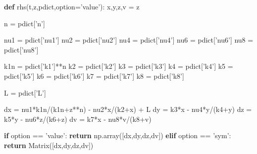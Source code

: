 \documentclass[
  english,
  a4paper,
  oneside]{article}
\newenvironment{Shaded}{}{}
\newcommand{\ControlFlowTok}[1]{\textcolor[rgb]{0.00,0.44,0.13}{\textbf{#1}}}
\newcommand{\KeywordTok}[1]{\textcolor[rgb]{0.00,0.44,0.13}{\textbf{#1}}}
\newcommand{\NormalTok}[1]{#1}
\newcommand{\OperatorTok}[1]{\textcolor[rgb]{0.40,0.40,0.40}{#1}}
\newcommand{\StringTok}[1]{\textcolor[rgb]{0.25,0.44,0.63}{#1}}
\begin{document}
\begin{Shaded}
\begin{Highlighting}[]
\KeywordTok{def}\NormalTok{ rhs(t,z,pdict,option}\OperatorTok{=}\StringTok{'value'}\NormalTok{):}
\NormalTok{    x,y,z,v }\OperatorTok{=}\NormalTok{ z}
    
\NormalTok{    n }\OperatorTok{=}\NormalTok{ pdict[}\StringTok{'n'}\NormalTok{]}
    
\NormalTok{    nu1 }\OperatorTok{=}\NormalTok{ pdict[}\StringTok{'nu1'}\NormalTok{]}
\NormalTok{    nu2 }\OperatorTok{=}\NormalTok{ pdict[}\StringTok{'nu2'}\NormalTok{]}
\NormalTok{    nu4 }\OperatorTok{=}\NormalTok{ pdict[}\StringTok{'nu4'}\NormalTok{]}
\NormalTok{    nu6 }\OperatorTok{=}\NormalTok{ pdict[}\StringTok{'nu6'}\NormalTok{]}
\NormalTok{    nu8 }\OperatorTok{=}\NormalTok{ pdict[}\StringTok{'nu8'}\NormalTok{]}
    
\NormalTok{    k1n }\OperatorTok{=}\NormalTok{ pdict[}\StringTok{'k1'}\NormalTok{]}\OperatorTok{**}\NormalTok{n}
\NormalTok{    k2 }\OperatorTok{=}\NormalTok{ pdict[}\StringTok{'k2'}\NormalTok{]}
\NormalTok{    k3 }\OperatorTok{=}\NormalTok{ pdict[}\StringTok{'k3'}\NormalTok{]}
\NormalTok{    k4 }\OperatorTok{=}\NormalTok{ pdict[}\StringTok{'k4'}\NormalTok{]}
\NormalTok{    k5 }\OperatorTok{=}\NormalTok{ pdict[}\StringTok{'k5'}\NormalTok{]}
\NormalTok{    k6 }\OperatorTok{=}\NormalTok{ pdict[}\StringTok{'k6'}\NormalTok{]}
\NormalTok{    k7 }\OperatorTok{=}\NormalTok{ pdict[}\StringTok{'k7'}\NormalTok{]}
\NormalTok{    k8 }\OperatorTok{=}\NormalTok{ pdict[}\StringTok{'k8'}\NormalTok{]}
    
\NormalTok{    L }\OperatorTok{=}\NormalTok{ pdict[}\StringTok{'L'}\NormalTok{]}
    
\NormalTok{    dx }\OperatorTok{=}\NormalTok{ nu1}\OperatorTok{*}\NormalTok{k1n}\OperatorTok{/}\NormalTok{(k1n}\OperatorTok{+}\NormalTok{z}\OperatorTok{**}\NormalTok{n) }\OperatorTok{-}\NormalTok{ nu2}\OperatorTok{*}\NormalTok{x}\OperatorTok{/}\NormalTok{(k2}\OperatorTok{+}\NormalTok{x) }\OperatorTok{+}\NormalTok{ L}
\NormalTok{    dy }\OperatorTok{=}\NormalTok{ k3}\OperatorTok{*}\NormalTok{x }\OperatorTok{-}\NormalTok{ nu4}\OperatorTok{*}\NormalTok{y}\OperatorTok{/}\NormalTok{(k4}\OperatorTok{+}\NormalTok{y)}
\NormalTok{    dz }\OperatorTok{=}\NormalTok{ k5}\OperatorTok{*}\NormalTok{y }\OperatorTok{-}\NormalTok{ nu6}\OperatorTok{*}\NormalTok{z}\OperatorTok{/}\NormalTok{(k6}\OperatorTok{+}\NormalTok{z)}
\NormalTok{    dv }\OperatorTok{=}\NormalTok{ k7}\OperatorTok{*}\NormalTok{x }\OperatorTok{-}\NormalTok{ nu8}\OperatorTok{*}\NormalTok{v}\OperatorTok{/}\NormalTok{(k8}\OperatorTok{+}\NormalTok{v)}
    
    \ControlFlowTok{if}\NormalTok{ option }\OperatorTok{==} \StringTok{'value'}\NormalTok{:}
        \ControlFlowTok{return}\NormalTok{ np.array([dx,dy,dz,dv])}
    \ControlFlowTok{elif}\NormalTok{ option }\OperatorTok{==} \StringTok{'sym'}\NormalTok{:}
        \ControlFlowTok{return}\NormalTok{ Matrix([dx,dy,dz,dv])}
\end{Highlighting}
\end{Shaded}
\end{document}
